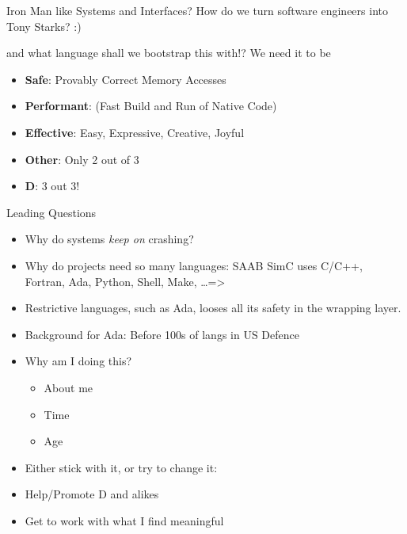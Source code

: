 \documentclass[xcolor=dvipsnames]{beamer}
\begin{document}
\begin{frame}[fragile]{Iron Man like Systems and Interfaces?}
  How do we turn software engineers into Tony Starks? :)
  \begin{figure}
  \end{figure}
  and what language shall we bootstrap this with!? We need it to be
  \begin{itemize}[<+->]
  \item \textbf{Safe}: Provably Correct Memory Accesses
  \item \textbf{Performant}: (Fast Build and Run of Native Code)
  \item \textbf{Effective}: Easy, Expressive, Creative, Joyful
  \end{itemize}

  \begin{itemize}[<+->]
  \item \textbf{Other}: Only 2 out of 3
  \item \textbf{D}: 3 out 3!
  \end{itemize}
\end{frame}

\begin{frame}[fragile]{Leading Questions}
  \begin{itemize}[<+->]
  \item Why do systems \emph{keep on} crashing?
  \item Why do projects need so many languages: SAAB SimC uses C/C++, Fortran,
    Ada, Python, Shell, Make, \ldots =>
  \item Restrictive languages, such as Ada, looses all its safety in the
    wrapping layer.
  \item Background for Ada: Before 100s of langs in US Defence
  \item Why am I doing this?
    \begin{itemize}[<+->]
    \item About me
    \item Time
    \item Age
    \end{itemize}
  \item Either stick with it, or try to change it:
  \item Help/Promote D and alikes
  \item Get to work with what I find meaningful
  \end{itemize}
\end{frame}
\end{document}

